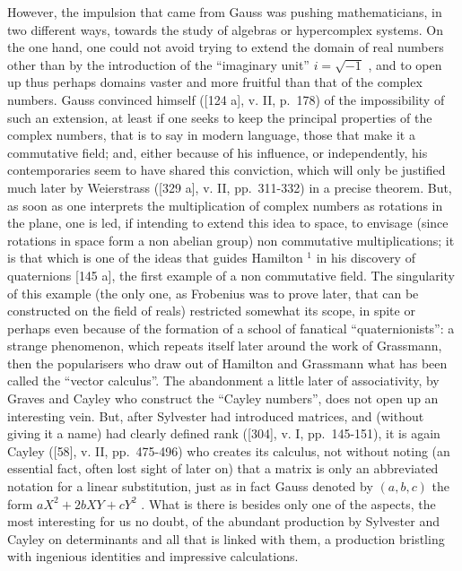 However, the impulsion that came from Gauss was pushing mathematicians, in two different ways, towards the study of algebras or hypercomplex systems. On the one hand, one could not avoid trying to extend the domain of real numbers other than by the introduction of the ``imaginary unit'' \(i = \sqrt{-1}\) , and to open up thus perhaps domains vaster and more fruitful than that of the complex numbers. Gauss convinced himself ({[}124 a{]}, v. II, p.~178) of the impossibility of such an extension, at least if one seeks to keep the principal properties of the complex numbers, that is to say in modern language, those that make it a commutative field; and, either because of his influence, or independently, his contemporaries seem to have shared this conviction, which will only be justified much later by Weierstrass ({[}329 a{]}, v. II, pp.~311-332) in a precise theorem. But, as soon as one interprets the multiplication of complex numbers as rotations in the plane, one is led, if intending to extend this idea to space, to envisage (since rotations in space form a non abelian group) non commutative multiplications; it is that which is one of the ideas that guides Hamilton \(^{1}\) in his discovery of quaternions {[}145 a{]}, the first example of a non commutative field. The singularity of this example (the only one, as Frobenius was to prove later, that can be constructed on the field of reals) restricted somewhat its scope, in spite or perhaps even because of the formation of a school of fanatical ``quaternionists'': a strange phenomenon, which repeats itself later around the work of Grassmann, then the popularisers who draw out of Hamilton and Grassmann what has been called the ``vector calculus''. The abandonment a little later of associativity, by Graves and Cayley who construct the ``Cayley numbers'', does not open up an interesting vein. But, after Sylvester had introduced matrices, and (without giving it a name) had clearly defined rank ({[}304{]}, v. I, pp.~145-151), it is again Cayley ({[}58{]}, v. II, pp.~475-496) who creates its calculus, not without noting (an essential fact, often lost sight of later on) that a matrix is only an abbreviated notation for a linear substitution, just as in fact Gauss denoted by \((a, b, c)\) the form \(aX^2 + 2bXY + cY^2\) . What is there is besides only one of the aspects, the most interesting for us no doubt, of the abundant production by Sylvester and Cayley on determinants and all that is linked with them, a production bristling with ingenious identities and impressive calculations.

